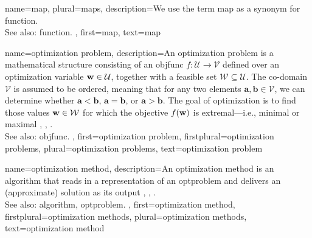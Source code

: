 {name={map}, plural={maps}, 
	description={We use the term map as a synonym for \gls{function}.
	\\
	See also: \gls{function}.
	},
	first={map},
	text={map}
}


{name={optimization problem}, 
	description={An optimization problem is a mathematical 
		   structure consisting of an \gls{objfunc} $f: \mathcal{U} \rightarrow \mathcal{V}$ 
		   defined over an optimization variable ${\bf w} \in \mathcal{U}$, together with a 
		   feasible set $\mathcal{W} \subseteq \mathcal{U}$. The co-domain $\mathcal{V}$ is 
		   assumed to be ordered, meaning that for any two elements $\mathbf{a}, \mathbf{b} \in \mathcal{V}$, 
		   we can determine whether $\mathbf{a} < \mathbf{b}$, $\mathbf{a} = \mathbf{b}$, 
		   or $\mathbf{a} > \mathbf{b}$. The goal of optimization is to find those values ${\bf w} \in \mathcal{W}$ 
		   for which the objective $f({\bf w})$ is extremal—i.e., minimal or maximal \cite{BoydConvexBook}, \cite{nesterov04}, \cite{BertsekasNonLinProgr}.
		   \\
		   See also: \gls{objfunc}.
	},
	first={optimization problem},
	firstplural={optimization problems}, 
	plural={optimization problems}, 
	text={optimization problem}
}

{name={optimization method},
	description={An optimization method is an \gls{algorithm} that 
		reads in a representation of an \gls{optproblem} and delivers an (approximate) solution 
		as its output \cite{BoydConvexBook}, \cite{nesterov04}, \cite{BertsekasNonLinProgr}.
		 \\
		 See also: \gls{algorithm}, \gls{optproblem}.
	},
	first={optimization method},
	firstplural={optimization methods}, 
	plural={optimization methods}, 
	text={optimization method}
}


